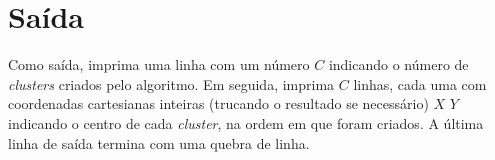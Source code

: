 \section*{Saída}

Como saída, imprima uma linha com um número $C$ indicando o número de \textit{clusters} criados pelo algoritmo. Em seguida, imprima $C$ linhas, cada uma com coordenadas cartesianas inteiras (trucando o resultado se necessário) $X$ $Y$ indicando o centro de cada \textit{cluster}, na ordem em que foram criados. A última linha de saída termina com uma quebra de linha.